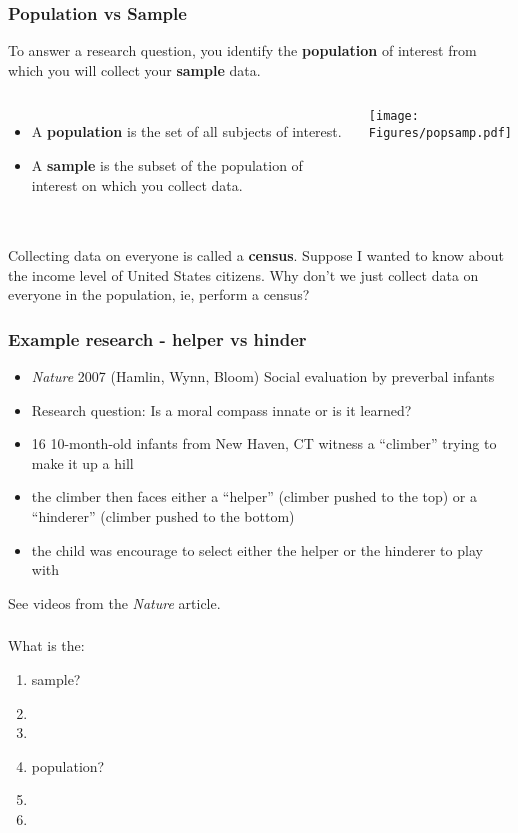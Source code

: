 \begin{frame}
\frametitle{Population vs Sample}
To answer a research question, you identify the \textbf{population} of interest from which you will collect your \textbf{sample} data.
\begin{columns}
\begin{itemize}
    \item
    A \textbf{population} is the set of all subjects of interest.
    \item
    A \textbf{sample} is the subset of the population of interest on which you collect data.
\end{itemize}
\texttt{[image: Figures/popsamp.pdf]}
\end{columns}
\end{frame}


\begin{frame}
\frametitle{\grp}
Collecting data on everyone is called a \textbf{census}.
\vskip20pt
Suppose I wanted to know about the income level of United States citizens.  Why don't we just collect data on everyone in the population, ie, perform a census?
\end{frame}

\begin{frame}
\frametitle{Example research - helper vs hinder}
\begin{itemize}
    \item
    \emph{Nature} 2007 (Hamlin, Wynn, Bloom) Social evaluation by preverbal infants
    \item
    Research question: Is a moral compass innate or is it learned?
    \item
    16 10-month-old infants from New Haven, CT  witness a ``climber'' trying to make it up a hill
    \item
    the climber then faces either a ``helper'' (climber pushed to the top) or a ``hinderer'' (climber pushed to the bottom)
    \item
    the child was encourage to select either the helper or the hinderer to play with
\end{itemize}
See videos from the \emph{Nature} article.
\end{frame}

\begin{frame}
\frametitle{\grp}
\begin{clicker}{What is the:}
\begin{enumerate}
\item sample?
\item[]
\item[]
\item population?
\item[]
\item[]
\end{enumerate}
\end{clicker}
\end{frame}


